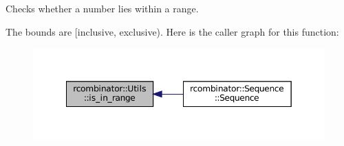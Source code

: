 Checks whether a number lies within a range. 

The bounds are \mbox{[}inclusive, exclusive). Here is the caller graph for this function\+:
\nopagebreak
\begin{figure}[H]
\begin{center}
\leavevmode
\includegraphics[width=349pt]{namespacercombinator_1_1Utils_a2693553db4ed242f1488e6c9fd491692_icgraph}
\end{center}
\end{figure}
